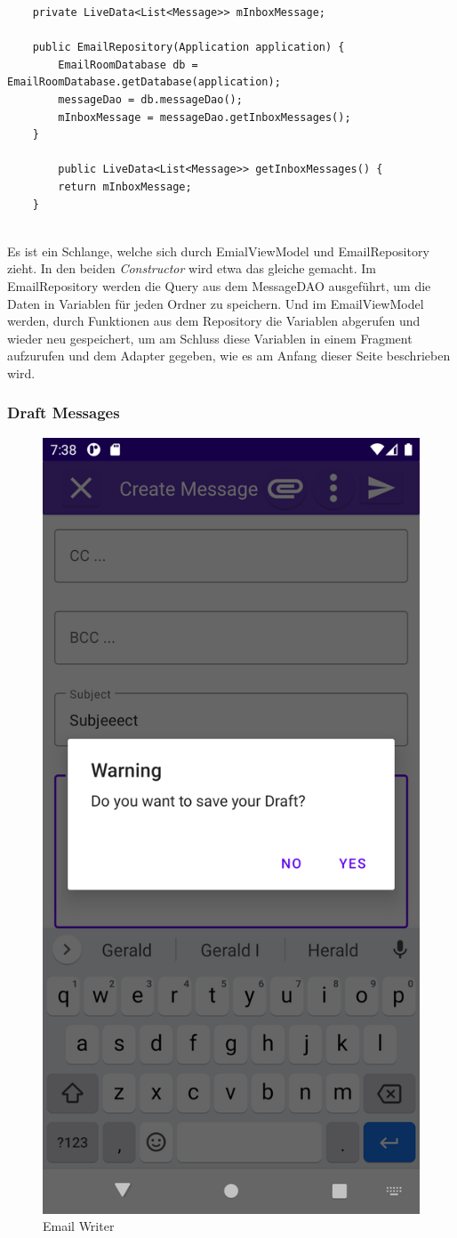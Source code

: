 \documentclass[a4paper,11pt]{article}
\begin{document}
\lstset{language=java}
\begin{lstlisting}
    private LiveData<List<Message>> mInboxMessage;

    public EmailRepository(Application application) {
        EmailRoomDatabase db = EmailRoomDatabase.getDatabase(application);
        messageDao = db.messageDao();
        mInboxMessage = messageDao.getInboxMessages();
    }

        public LiveData<List<Message>> getInboxMessages() {
        return mInboxMessage;
    }


\end{lstlisting}

Es ist ein Schlange, welche sich durch EmialViewModel und EmailRepository zieht. In den beiden \textit{Constructor} wird etwa das gleiche gemacht. Im EmailRepository
werden die Query aus dem MessageDAO ausgeführt, um die Daten in Variablen für jeden Ordner zu speichern. Und im EmailViewModel werden, durch Funktionen aus dem Repository 
die Variablen abgerufen und wieder neu gespeichert, um am Schluss diese Variablen in einem Fragment aufzurufen und dem Adapter gegeben, wie es am Anfang dieser Seite beschrieben 
wird.

\subsubsection{Draft Messages}

\begingroup
\setlength{\intextsep}{5pt}
\setlength{\columnsep}{4pt}

\begin{figure}
    \centering
        \includegraphics[width=.3\textwidth]{media/EWAttention.png}
        \caption{Email Writer}
\end{figure}
\end{document}
